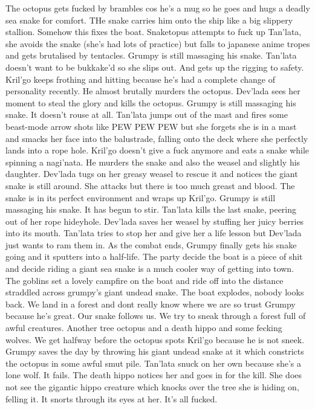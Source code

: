 The octopus gets fucked by brambles cos he’s a mug so he goes and hugs a deadly sea snake for comfort. THe snake carries him onto the ship like a big slippery stallion. Somehow this fixes the boat.\medskip
Snaketopus attempts to fuck up Tan’lata, she avoids the snake (she’s had lots of practice) but falls to japanese anime tropes and gets brutalised by tentacles.\medskip
Grumpy is still massaging his snake.\medskip
Tan’lata doesn’t want to be bukkake’d so she slips out. And gets up the rigging to safety.\medskip
Kril’go keeps frothing and hitting because he’s had a complete change of personality recently. He almost brutally murders the octopus. Dev’lada sees her moment to steal the glory and kills the octopus.\medskip
Grumpy is still massaging his snake. It doesn’t rouse at all.\medskip
Tan’lata jumps out of the mast and fires some beast-mode arrow shots like PEW PEW PEW but she forgets she is in a mast and smacks her face into the balustrade, falling onto the deck where she perfectly lands into a rope hole.\medskip
Kril’go doesn’t give a fuck anymore and eats a snake while spinning a nagi’nata. He murders the snake and also the weasel and slightly his daughter.\medskip
Dev’lada tugs on her greasy weasel to rescue it and notices the giant snake is still around. She attacks but there is too much greast and blood. The snake is in its perfect environment and wraps up Kril’go. Grumpy is still massaging his snake. It has begun to stir.\medskip
Tan’lata kills the last snake, peering out of her rope hideyhole.\medskip
Dev’lada saves her weasel by stuffing her juicy berries into its mouth. Tan’lata tries to stop her and give her a life lesson but Dev’lada just wants to ram them in.\medskip
As the combat ends, Grumpy finally gets his snake going and it sputters into a half-life. The party decide the boat is a piece of shit and decide riding a giant sea snake is a much cooler way of getting into town.\medskip
The goblins set a lovely campfire on the boat and ride off into the distance straddled across grumpy’s giant undead snake.\medskip
The boat explodes, nobody looks back.\medskip
We land in a forest and dont really know where we are so trust Grumpy because he’s great. Our snake follows us.\medskip
We try to sneak through a forest full of awful creatures. Another tree octopus and a death hippo and some fecking wolves. We get halfway before the octopus spots Kril’go because he is not sneek. Grumpy saves the day by throwing his giant undead snake at it which constricts the octopus in some awful smut pile.\medskip
Tan’lata snuck on her own because she’s a lone wolf. It fails. The death hippo notices her and goes in for the kill. She does not see the gigantic hippo creature which knocks over the tree she is hiding on, felling it. It snorts through its eyes at her. It’s all fucked.\medskip
